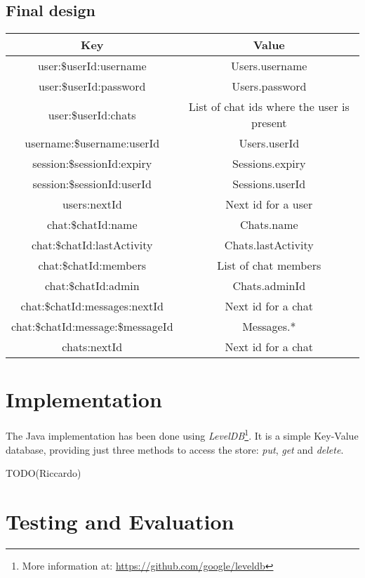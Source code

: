 \documentclass[10pt]{article}
\begin{document}
\subsection{Final design}
\begin{center}
\begin{tabular}{ | c | c | }
    \hline
    \textbf{Key} & \textbf{Value} \\\hline
    user:\$userId:username & Users.username \\\hline
    user:\$userId:password & Users.password \\\hline
    user:\$userId:chats & List of chat ids where the user is present \\\hline
    username:\$username:userId & Users.userId \\\hline
    session:\$sessionId:expiry & Sessions.expiry \\\hline
    session:\$sessionId:userId & Sessions.userId \\\hline
    users:nextId & Next id for a user \\\hline
    chat:\$chatId:name & Chats.name \\\hline
    chat:\$chatId:lastActivity & Chats.lastActivity \\\hline
    chat:\$chatId:members & List of chat members \\\hline
    chat:\$chatId:admin & Chats.adminId\\\hline
    chat:\$chatId:messages:nextId & Next id for a chat \\\hline
    chat:\$chatId:message:\$messageId & Messages.* \\\hline
    chats:nextId & Next id for a chat \\\hline
\end{tabular}
\end{center}

\section{Implementation}
The Java implementation has been done using \emph{LevelDB}\footnote{More information
at: \url{https://github.com/google/leveldb}}. It is a simple Key-Value database, 
providing just three methods to access the store: \emph{put}, \emph{get} and 
\emph{delete}.

TODO(Riccardo)

\section{Testing and Evaluation}
\end{document}
